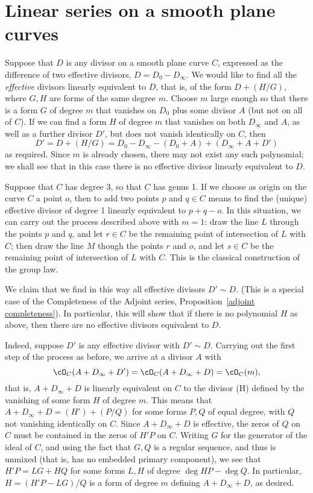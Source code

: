 \section{Linear series on a smooth plane curves}\label{linear series on smooth plane curves}

Suppose that $D$ is any divisor on a smooth plane curve $C$, expressed as the difference of
two effective divisors, $D= D_0-D_\infty$. We would like to find all the \emph{effective} divisors linearly equivalent to $D$, that is, of the form
$D + (H/G)$, where $G, H$ are forms of the same degree $m$. Choose $m$ large enough so that
there is
 a form $G$ of degree $m$ that vanishes on $D_0$ plus some divisor $A$ (but not on all of $C$). If we can find a form $H$ of degree $m$ that vanishes on both $D_\infty$ and $A$, as well as a further divisor $D'$, but does not vanish identically on $C$, then
$$
D' = D + (H/G) = D_0- D_\infty - (D_0+A)+(D_\infty+A+D')
$$
as required. Since $m$ is already chosen, there may not exist any such polynomial; we shall see that in this case there is no effective divisor linearly equivalent to $D$. 

\begin{example}
Suppose that $C$ has degree 3, so that $C$ has genus 1. If we choose as origin on the curve $C$ a point $o$, then to add two points $p$ and $q \in C$ means to find the (unique) effective divisor of degree 1 linearly equivalent to $p + q - o$. In this situation, we can carry out the process described above with $m=1$: draw the line $L$ through the points $p$ and $q$, and let $r \in C$ be the remaining point of intersection of $L$ with $C$; then draw the line $M$ though the points $r$ and $o$, and let $s \in C$ be the remaining point of intersection of $L$ with $C$. This is the classical construction of the group law.
\end{example}

We claim that we find in this way all effective divisors $D' \sim D$. (This is a special case of the Completeness of the Adjoint series, Proposition~\ref{adjoint completeness}). In particular, this will show that if there is no polynomial $H$ as above, then there are no effective divisors equivalent to $D$.

Indeed, suppose $D'$ is any effective divisor with $D' \sim D$. Carrying out the first step of the process as before, we arrive at a divisor $A$ with 
$$
\cO_C(A+D_\infty+D') = \cO_C(A+D_\infty+D)  = \cO_C(m),
$$
that is, $A+D_\infty+D$ is linearly equivalent on $C$ to the divisor (H) defined by the vanishing of some form $H$ of degree $m$. This means that
$A+D_\infty+D  = (H') +(P/Q)$ for some forms $P,Q$ of equal degree, with $Q$ not vanishing identically on $C$. Since $A+D_\infty+D$ is effective,
the zeros of $Q$ on $C$ must be contained in the zeros of $H'P$ on $C$. Writing
$G$ for the generator of the ideal of $C$, and using the fact that
$G,Q$ is a regular sequence, and thus is unmixed (that is, has no embedded primary component), we see that $H'P = LG+HQ$ for some
forms $L,H$ of degree $\deg HP - \deg Q$. In particular, $H = (H'P- LG)/Q$ is a form
of degree $m$ defining $A+D_\infty+D$, as desired.

